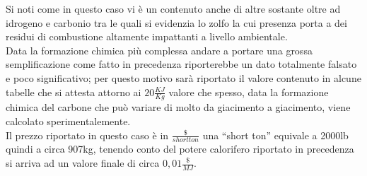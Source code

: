 Si noti come in questo caso vi è un contenuto anche di altre sostante oltre ad idrogeno e carbonio tra le quali si evidenzia lo zolfo la cui presenza porta a dei residui di combustione altamente impattanti a livello ambientale.\\
Data la formazione chimica più complessa andare a portare una grossa semplificazione come fatto in precedenza riporterebbe un dato totalmente falsato e poco significativo; per questo motivo sarà riportato il valore contenuto in alcune tabelle che si attesta attorno ai  $20\frac{KJ}{Kg}$ valore che spesso, data la formazione chimica del carbone che può variare di molto da giacimento a giacimento, viene calcolato sperimentalemente.\\
Il prezzo riportato in questo caso è in $\frac{\$}{short ton}$ una \enquote{short ton} equivale a 2000lb quindi a circa 907kg, tenendo conto del potere calorifero riportato in precedenza si arriva ad un valore finale di circa $0,01\frac{\$}{MJ}$.
